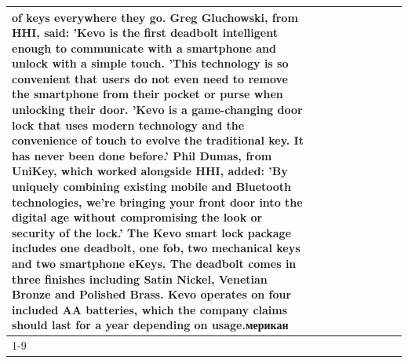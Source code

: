\begin{table}[H]
\begin{tabular}{lllrlllll}
of keys everywhere they go. Greg Gluchowski, from HHI, said: 'Kevo is the first deadbolt intelligent enough to communicate with a smartphone and unlock with a simple touch. 'This technology is so convenient that users do not even need to remove the smartphone from their pocket or purse when unlocking their door. 'Kevo is a game-changing door lock that uses modern technology and the convenience of touch to evolve the traditional key. It has never been done before.' Phil Dumas, from UniKey, which worked alongside HHI, added: 'By uniquely combining existing mobile and Bluetooth technologies, we’re bringing your front door into the digital age without compromising the look or security of the lock.' The Kevo smart lock package includes one deadbolt, one fob, two mechanical keys and two smartphone eKeys. The deadbolt comes in three finishes including Satin Nickel, Venetian Bronze and Polished Brass. Kevo operates on four included AA batteries, which the company claims should last for a year depending on usage.мерикан \\
\cline{1-9}

\end{tabular}
\end{table}
